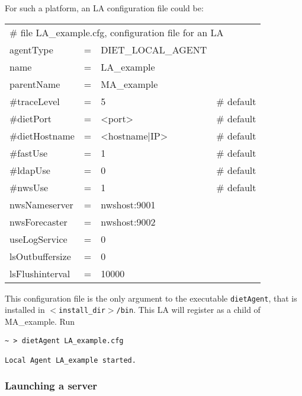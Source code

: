 For such a platform, an LA configuration file could be:
\tt
\begin{center}
 \footnotesize
 \begin{tabular}{lcll}
  \multicolumn{4}{l}{\# file LA\_example.cfg, configuration file for an LA}\\
  agentType    &=&DIET\_LOCAL\_AGENT&\\
  name         &=&LA\_example       &\\
  parentName   &=&MA\_example       &\\
  \#traceLevel &=&5                 &\# default\\
  \#dietPort    &=&<port>             &\# default\\
  \#dietHostname&=&<hostname|IP>      &\# default\\
  \#fastUse    &=&1                 &\# default\\
  \#ldapUse    &=&0                 &\# default\\
  \#nwsUse     &=&1                 &\# default\\
  nwsNameserver&=&nwshost:9001      &\\
  nwsForecaster&=&nwshost:9002      &\\
  useLogService &=& 0                 &\\
  lsOutbuffersize &=& 0               &\\
  lsFlushinterval &=& 10000           &\\
 \end{tabular}
\end{center}
\rm

This configuration file is the only argument to the executable
\texttt{dietAgent}, that is installed in
\texttt{$<$install\_dir$>$/bin}. This LA will register as a child of
MA\_example. Run {\footnotesize
\begin{verbatim}
~ > dietAgent LA_example.cfg

Local Agent LA_example started.
\end{verbatim}
}

\subsubsection{Launching a server}

